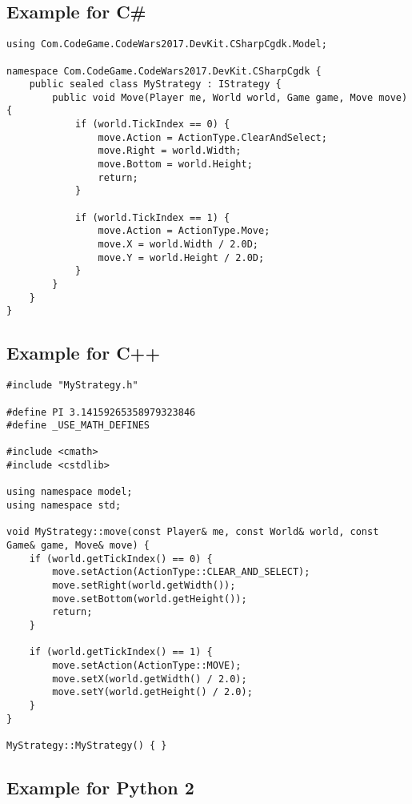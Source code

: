 \subsection{Example for C\#}

\begin{verbatim}
using Com.CodeGame.CodeWars2017.DevKit.CSharpCgdk.Model;

namespace Com.CodeGame.CodeWars2017.DevKit.CSharpCgdk {
    public sealed class MyStrategy : IStrategy {
        public void Move(Player me, World world, Game game, Move move) {
            if (world.TickIndex == 0) {
                move.Action = ActionType.ClearAndSelect;
                move.Right = world.Width;
                move.Bottom = world.Height;
                return;
            }

            if (world.TickIndex == 1) {
                move.Action = ActionType.Move;
                move.X = world.Width / 2.0D;
                move.Y = world.Height / 2.0D;
            }
        }
    }
}
\end{verbatim}

\newpage
\subsection{Example for C++}

\begin{verbatim}
#include "MyStrategy.h"

#define PI 3.14159265358979323846
#define _USE_MATH_DEFINES

#include <cmath>
#include <cstdlib>

using namespace model;
using namespace std;

void MyStrategy::move(const Player& me, const World& world, const Game& game, Move& move) {
    if (world.getTickIndex() == 0) {
        move.setAction(ActionType::CLEAR_AND_SELECT);
        move.setRight(world.getWidth());
        move.setBottom(world.getHeight());
        return;
    }

    if (world.getTickIndex() == 1) {
        move.setAction(ActionType::MOVE);
        move.setX(world.getWidth() / 2.0);
        move.setY(world.getHeight() / 2.0);
    }
}

MyStrategy::MyStrategy() { }
\end{verbatim}

\newpage
\subsection{Example for Python 2}

